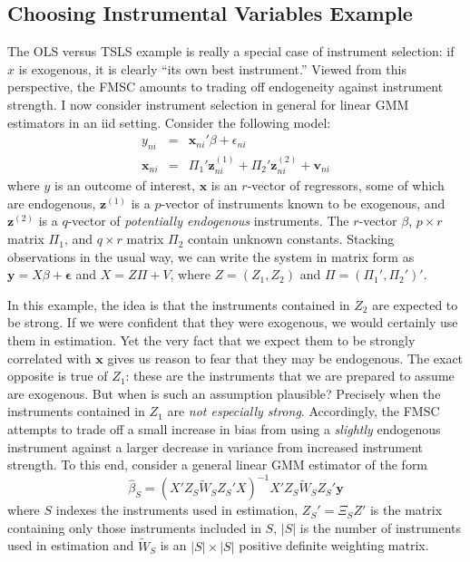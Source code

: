 \subsection{Choosing Instrumental Variables Example}
\label{sec:chooseIVexample}
The OLS versus TSLS example is really a special case of instrument selection: if $x$ is exogenous, it is clearly ``its own best instrument.'' 
Viewed from this perspective, the FMSC amounts to trading off endogeneity against instrument strength. I now consider instrument selection in general for linear GMM estimators in an iid setting. 
Consider the following model:
\begin{eqnarray}
  y_{ni} &=& \mathbf{x}_{ni}' \beta +  \epsilon_{ni}\\
    \mathbf{x}_{ni} &=&  \Pi_1' \mathbf{z}_{ni}^{(1)} + \Pi_2'\mathbf{z}_{ni}^{(2)} + \mathbf{v}_{ni}
\end{eqnarray}
where $y$ is an outcome of interest, $\mathbf{x}$ is an $r$-vector of regressors, some of which are endogenous, $\mathbf{z}^{(1)}$ is a $p$-vector of instruments known to be exogenous, and $\mathbf{z}^{(2)}$ is a $q$-vector  of \emph{potentially endogenous} instruments. 
The $r$-vector $\beta$, $p\times r$ matrix $\Pi_1$, and $q\times r$ matrix $\Pi_2$ contain unknown constants. Stacking observations in the usual way, we can write the system in matrix form as $\mathbf{y} = X\beta +\boldsymbol{\epsilon}$ and $X =  Z \Pi + V$, where $Z = (Z_1, Z_2)$ and $\Pi = (\Pi_1', \Pi_2')'$. 

In this example, the idea is that the instruments contained in $Z_2$ are expected to be strong.
If we were confident that they were exogenous, we would certainly use them in estimation. 
Yet the very fact that we expect them to be strongly correlated with $\mathbf{x}$ gives us reason to fear that they may be endogenous. 
The exact opposite is true of $Z_1$: these are the instruments that we are prepared to assume are exogenous. 
But when is such an assumption plausible? Precisely when the instruments contained in $Z_1$ are \emph{not especially strong}. 
Accordingly, the FMSC attempts to trade off a small increase in bias from using a \emph{slightly} endogenous instrument against a larger decrease in variance from increased instrument strength.
To this end, consider a general linear GMM estimator of the form
$$\widehat{\beta}_S = (X'Z_S \widetilde{W}_S Z_S' X)^{-1}X'Z_S \widetilde{W}_S  Z_S' \mathbf{y}$$
where $S$ indexes the instruments used in estimation, $Z_S'  = \Xi_S Z'$ is the matrix containing only those instruments included in $S$, $|S|$ is the number of instruments used in estimation and $\widetilde{W}_S$ is an $|S|\times|S|$ positive definite weighting matrix. 


